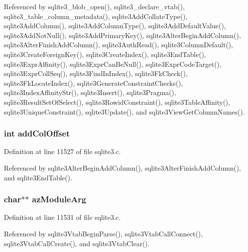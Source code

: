 Referenced by sqlite3\+\_\+blob\+\_\+open(), sqlite3\+\_\+declare\+\_\+vtab(), sqlite3\+\_\+table\+\_\+column\+\_\+metadata(), sqlite3\+Add\+Collate\+Type(), sqlite3\+Add\+Column(), sqlite3\+Add\+Column\+Type(), sqlite3\+Add\+Default\+Value(), sqlite3\+Add\+Not\+Null(), sqlite3\+Add\+Primary\+Key(), sqlite3\+Alter\+Begin\+Add\+Column(), sqlite3\+Alter\+Finish\+Add\+Column(), sqlite3\+Auth\+Read(), sqlite3\+Column\+Default(), sqlite3\+Create\+Foreign\+Key(), sqlite3\+Create\+Index(), sqlite3\+End\+Table(), sqlite3\+Expr\+Affinity(), sqlite3\+Expr\+Can\+Be\+Null(), sqlite3\+Expr\+Code\+Target(), sqlite3\+Expr\+Coll\+Seq(), sqlite3\+Find\+In\+Index(), sqlite3\+Fk\+Check(), sqlite3\+Fk\+Locate\+Index(), sqlite3\+Generate\+Constraint\+Checks(), sqlite3\+Index\+Affinity\+Str(), sqlite3\+Insert(), sqlite3\+Pragma(), sqlite3\+Result\+Set\+Of\+Select(), sqlite3\+Rowid\+Constraint(), sqlite3\+Table\+Affinity(), sqlite3\+Unique\+Constraint(), sqlite3\+Update(), and sqlite3\+View\+Get\+Column\+Names().

\hypertarget{struct_table_abedfd891b3393138e3e1aaf77459a3f9}{}
\subsubsection[{add\+Col\+Offset}]{\setlength{\rightskip}{0pt plus 5cm}int add\+Col\+Offset}\label{struct_table_abedfd891b3393138e3e1aaf77459a3f9}


Definition at line 11527 of file sqlite3.\+c.



Referenced by sqlite3\+Alter\+Begin\+Add\+Column(), sqlite3\+Alter\+Finish\+Add\+Column(), and sqlite3\+End\+Table().

\hypertarget{struct_table_a5b721c369ead989ee430d0cce74cac2b}{}
\subsubsection[{az\+Module\+Arg}]{\setlength{\rightskip}{0pt plus 5cm}char$\ast$$\ast$ az\+Module\+Arg}\label{struct_table_a5b721c369ead989ee430d0cce74cac2b}


Definition at line 11531 of file sqlite3.\+c.



Referenced by sqlite3\+Vtab\+Begin\+Parse(), sqlite3\+Vtab\+Call\+Connect(), sqlite3\+Vtab\+Call\+Create(), and sqlite3\+Vtab\+Clear().

